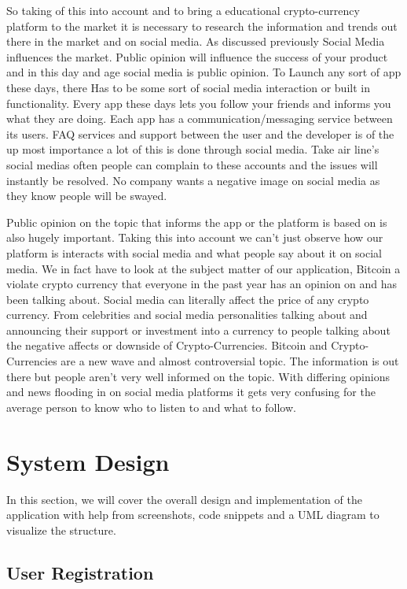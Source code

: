 So taking of this into account and to bring a educational crypto-currency platform to the market it is necessary to research the information and trends out there in the market and on social media. As discussed previously Social Media influences the market. Public opinion will influence the success of your product and in this day and age social media is public opinion. To Launch any sort of app these days, there Has to be some sort of social media interaction or built in functionality. Every app these days lets you follow your friends and informs you what they are doing. Each app has a communication/messaging service between its users. FAQ services and support between the user and the developer is of the up most importance a lot of this is done through social media. Take air line's social medias often people can complain to these accounts and the issues will instantly be resolved. No company wants a negative image on social media as they know people will be swayed. 

Public opinion on the topic that informs the app or the platform is based on is also hugely important. Taking this into account we can't just observe how our platform is interacts with social media and what people say about it on social media. We in fact have to look at the subject matter of our application, Bitcoin a violate crypto currency that everyone in the past year has an opinion on and has been talking about. Social media can literally affect the price of any crypto currency. From celebrities and social media personalities talking about and announcing their support or investment into a currency to people talking about the negative affects or downside of Crypto-Currencies. Bitcoin and Crypto-Currencies are a new wave and almost controversial topic. The information is out there but people aren't very well informed on the topic. With differing opinions and news flooding in on social media platforms it gets very confusing for the average person to know who to listen to and what to follow.


\chapter{System Design}
In this section, we will cover the overall design and implementation of the application with help from screenshots, code snippets and a UML diagram to visualize the structure.

\section{User Registration}

